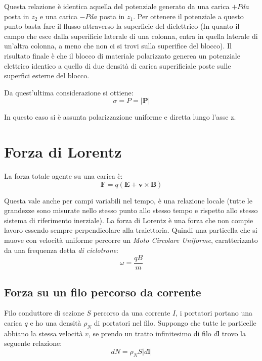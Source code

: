 \documentclass[a4paper]{scrarticle}
\begin{document}
Questa relazione è identica  aquella del potenziale generato da una carica $+Pda$ posta in $z_2$ e una carica $-Pda$ posta in $z_1$.
Per ottenere il potenziale a questo punto basta fare il flusso attraverso la superficie del dielettrico (In quanto il campo che esce dalla superificie laterale di una colonna, entra in quella laterale di un'altra colonna, a meno che non ci si trovi sulla superifice del blocco).
Il risultato finale è che il blocco di materiale polarizzato generea un potenziale elettrico identico a quello di due densità di carica superificiale poste sulle superfici esterne del blocco.

Da quest'ultima considerazione si ottiene:
\begin{equation}
    \sigma  = P = |\bm P|
\end{equation}

In questo caso si è assunta polarizzazione uniforme e diretta lungo l'asse z.


\section{Forza di Lorentz}

La forza totale agente su una carica è:
\begin{equation}
    \bm F = q \left(\bm E + \bm v \times \bm B\right)
\end{equation}

Questa vale anche per campi variabili nel tempo, è una relazione locale (tutte le grandezze sono misurate nello stesso punto allo stesso tempo e rispetto allo stesso sistema di riferimento inerziale).
La forza di Lorentz è una forza che non compie lavoro essendo sempre perpendicolare alla traiettoria.
Quindi una particella che si muove con velocità uniforme percorre un \emph{Moto Circolare Uniforme}, caratterizzato da una frequenza detta \emph{di ciclotrone}:
\begin{equation}
    \omega = \frac{qB}{m}
\end{equation}

\subsection*{Forza su un filo percorso da corrente}

Filo conduttore di sezione $S$ percorso da una corrente $I$, i portatori portano una carica $q$ e ho una densità $\rho_N$ di portatori nel filo.
Suppongo che tutte le particelle abbiano la stessa velocità $v$, se prendo un tratto infinitesimo di filo $d\bm l $ trovo la seguente relazione:
\begin{equation*}
    dN = \rho_N S |d\bm l|
\end{equation*}
\end{document}
